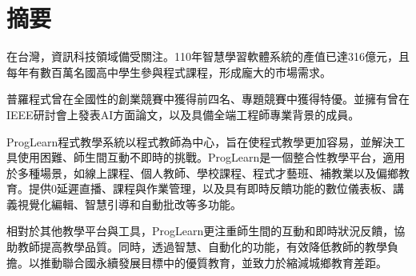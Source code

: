 \section*{摘要} %
在台灣，資訊科技領域備受關注。110年智慧學習軟體系統的產值已達316億元，且每年有數百萬名國高中學生參與程式課程，形成龐大的市場需求。

普羅程式曾在全國性的創業競賽中獲得前四名、專題競賽中獲得特優。並擁有曾在IEEE研討會上發表AI方面論文，以及具備全端工程師專業背景的成員。

ProgLearn程式教學系統以程式教師為中心，旨在使程式教學更加容易，並解決工具使用困難、師生間互動不即時的挑戰。ProgLearn是一個整合性教學平台，適用於多種場景，如線上課程、個人教師、學校課程、程式才藝班、補教業以及偏鄉教育。提供0延遲直播、課程與作業管理，以及具有即時反饋功能的數位儀表板、講義視覺化編輯、智慧引導和自動批改等多功能。

相對於其他教學平台與工具，ProgLearn更注重師生間的互動和即時狀況反饋，協助教師提高教學品質。同時，透過智慧、自動化的功能，有效降低教師的教學負擔。以推動聯合國永續發展目標中的優質教育，並致力於縮減城鄉教育差距。
